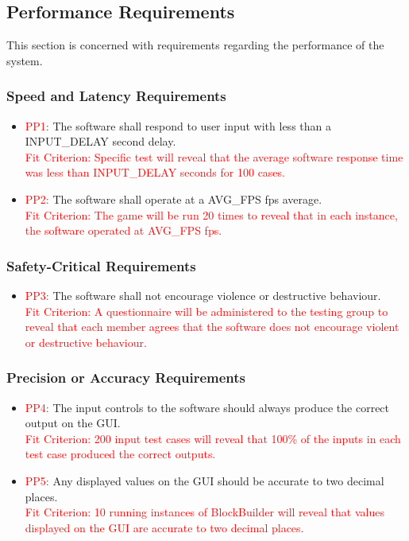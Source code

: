 \documentclass[12pt, titlepage]{article}
\begin{document}
\subsection{Performance Requirements}
This section is concerned with requirements regarding the performance of the system.
\subsubsection{Speed and Latency Requirements}
\begin{itemize}
\item \textcolor{red}{PP1: }The software shall respond to user input with less than a INPUT\_DELAY second delay.\\
\textcolor{red}{Fit Criterion: Specific test will reveal that the average software response time was less than INPUT\_DELAY seconds for 100 cases.}
\item \textcolor{red}{PP2: }The software shall operate at a AVG\_FPS fps average.\\
\textcolor{red}{Fit Criterion: The game will be run 20 times to reveal that in each instance, the software operated at AVG\_FPS fps.}
\end{itemize}

\subsubsection{Safety-Critical Requirements}
\begin{itemize}
\item \textcolor{red}{PP3: }The software shall not encourage violence or destructive behaviour.\\
\textcolor{red}{Fit Criterion: A questionnaire will be administered to the testing group to reveal that each member agrees that the software does not encourage violent or destructive behaviour.}
\end{itemize}

\subsubsection{Precision or Accuracy Requirements}
\begin{itemize}
\item \textcolor{red}{PP4: }The input controls to the software should always produce the correct output on the GUI.\\
\textcolor{red}{Fit Criterion: 200 input test cases will reveal that 100\% of the inputs in each test case produced the correct outputs.}
\end{itemize}
\begin{itemize}
\item \textcolor{red}{PP5: }Any displayed values on the GUI should be accurate to two decimal places.\\
\textcolor{red}{Fit Criterion: 10 running instances of BlockBuilder will reveal that values displayed on the GUI are accurate to two decimal places.}
\end{itemize}
\end{document}

